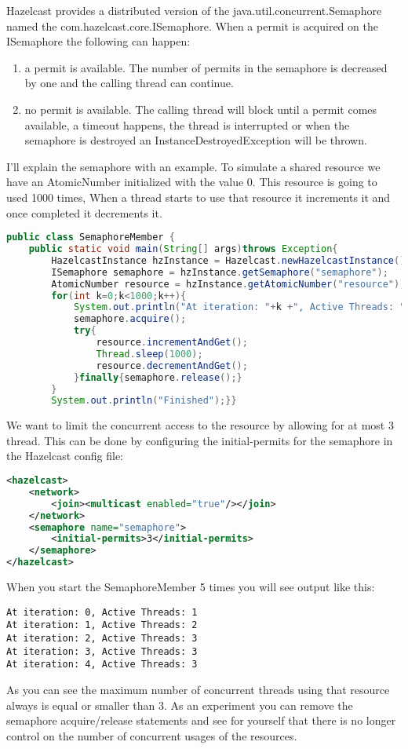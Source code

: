 Hazelcast provides a distributed version of the java.util.concurrent.Semaphore named the com.hazelcast.core.ISemaphore. When a permit is acquired on the ISemaphore the following can happen:
\begin{enumerate}
\item a permit is available. The number of permits in the semaphore is decreased by one and the calling thread can continue. 
\item no permit is available. The calling thread will block until a permit comes available, a timeout happens, the thread is interrupted or when the semaphore is destroyed an InstanceDestroyedException will be thrown.
\end{enumerate}
I'll explain the semaphore with an example. To simulate a shared resource we have an AtomicNumber initialized with the value 0. This resource is going to used 1000 times, When a thread starts to use that resource it increments it and once completed it decrements it.
\begin{lstlisting}[language=java]
public class SemaphoreMember {
    public static void main(String[] args)throws Exception{
        HazelcastInstance hzInstance = Hazelcast.newHazelcastInstance();
        ISemaphore semaphore = hzInstance.getSemaphore("semaphore");
        AtomicNumber resource = hzInstance.getAtomicNumber("resource");
        for(int k=0;k<1000;k++){
            System.out.println("At iteration: "+k +", Active Threads: " + resource.get());
            semaphore.acquire();
            try{
                resource.incrementAndGet();
                Thread.sleep(1000);
                resource.decrementAndGet();
            }finally{semaphore.release();}
        }
        System.out.println("Finished");}}
\end{lstlisting}
We want to limit the concurrent access to the resource by allowing for at most 3 thread. This can be done by configuring the initial-permits for the semaphore in the Hazelcast config file:
\begin{lstlisting}[language=xml]
<hazelcast>
    <network>
        <join><multicast enabled="true"/></join>
    </network>
    <semaphore name="semaphore">
        <initial-permits>3</initial-permits>
    </semaphore>
</hazelcast>
\end{lstlisting}
When you start the SemaphoreMember 5 times you will see output like this:
\begin{lstlisting}
At iteration: 0, Active Threads: 1
At iteration: 1, Active Threads: 2
At iteration: 2, Active Threads: 3
At iteration: 3, Active Threads: 3
At iteration: 4, Active Threads: 3
\end{lstlisting}
As you can see the maximum number of concurrent threads using that resource always is equal or smaller than 3. As an experiment you can remove the semaphore acquire/release statements and see for yourself that there is no longer control on the number of concurrent usages of the resources.

